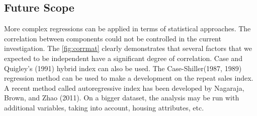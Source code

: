 \documentclass[12pt]{article}
\begin{document}
\subsection{Future Scope}
More complex regressions can be applied in terms of statistical approaches. The correlation between components could not be controlled in the current investigation. The \autoref{fig:corrmat} clearly demonstrates that several factors that we expected to be independent have a significant degree of correlation. Case and Quigley's (1991) hybrid index can also be used.
The Case-Shiller(1987, 1989) regression method can be used to make a development on the repeat sales index. A recent method called autoregressive index has been developed by Nagaraja, Brown, and Zhao (2011).
On a bigger dataset, the analysis may be run with additional variables, taking into account, housing attributes, etc.
\end{document}
